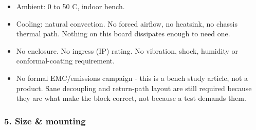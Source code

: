 \documentclass[11pt,a4paper]{article}
\begin{document}
\begin{itemize}
\item Ambient: 0 to 50 C, indoor bench.
\item Cooling: natural convection. No forced airflow, no heatsink, no chassis
thermal path. Nothing on this board dissipates enough to need one.
\item No enclosure. No ingress (IP) rating. No vibration, shock, humidity or
conformal-coating requirement.
\item No formal EMC/emissions campaign - this is a bench study article, not a
product. Sane decoupling and return-path layout are still required because
they are what make the block correct, not because a test demands them.
\end{itemize}
\subsubsection*{5. Size \& mounting}
\end{document}
